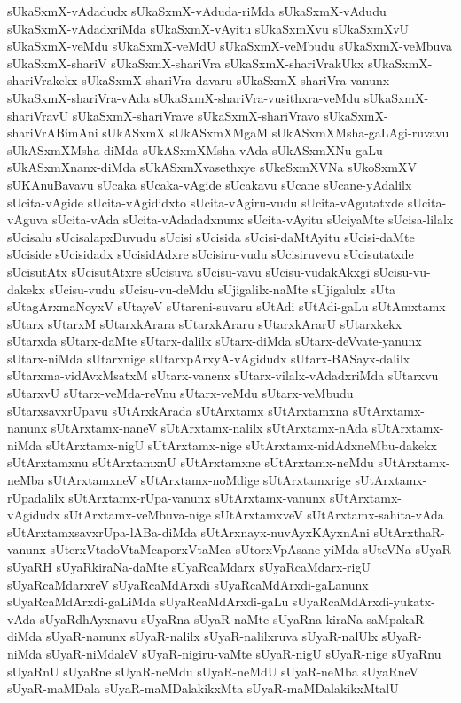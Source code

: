 {sUkaSxmX-vAdadudx
sUkaSxmX-vAduda-riMda
sUkaSxmX-vAdudu
sUkaSxmX-vAdadxriMda
sUkaSxmX-vAyitu
sUkaSxmXvu
sUkaSxmXvU
sUkaSxmX-veMdu
sUkaSxmX-veMdU
sUkaSxmX-veMbudu
sUkaSxmX-veMbuva
sUkaSxmX-shariV
sUkaSxmX-shariVra
sUkaSxmX-shariVrakUkx
sUkaSxmX-shariVrakekx
sUkaSxmX-shariVra-davaru
sUkaSxmX-shariVra-vanunx
sUkaSxmX-shariVra-vAda
sUkaSxmX-shariVra-vusithxra-veMdu
sUkaSxmX-shariVravU
sUkaSxmX-shariVrave
sUkaSxmX-shariVravo
sUkaSxmX-shariVrABimAni
sUkASxmX
sUkASxmXMgaM
sUkASxmXMsha-gaLAgi-ruvavu
sUkASxmXMsha-diMda
sUkASxmXMsha-vAda
sUkASxmXNu-gaLu
sUkASxmXnanx-diMda
sUkASxmXvasethxye
sUkeSxmXVNa
sUkoSxmXV
sUKAnuBavavu
sUcaka
sUcaka-vAgide
sUcakavu
sUcane
sUcane-yAdalilx
sUcita-vAgide
sUcita-vAgididxto
sUcita-vAgiru-vudu
sUcita-vAgutatxde
sUcita-vAguva
sUcita-vAda
sUcita-vAdadadxnunx
sUcita-vAyitu
sUciyaMte
sUcisa-lilalx
sUcisalu
sUcisalapxDuvudu
sUcisi
sUcisida
sUcisi-daMtAyitu
sUcisi-daMte
sUciside
sUcisidadx
sUcisidAdxre
sUcisiru-vudu
sUcisiruvevu
sUcisutatxde
sUcisutAtx
sUcisutAtxre
sUcisuva
sUcisu-vavu
sUcisu-vudakAkxgi
sUcisu-vu-dakekx
sUcisu-vudu
sUcisu-vu-deMdu
sUjigalilx-naMte
sUjigalulx
sUta
sUtagArxmaNoyxV
sUtayeV
sUtareni-suvaru
sUtAdi
sUtAdi-gaLu
sUtAmxtamx
sUtarx
sUtarxM
sUtarxkArara
sUtarxkAraru
sUtarxkArarU
sUtarxkekx
sUtarxda
sUtarx-daMte
sUtarx-dalilx
sUtarx-diMda
sUtarx-deVvate-yanunx
sUtarx-niMda
sUtarxnige
sUtarxpArxyA-vAgidudx
sUtarx-BASayx-dalilx
sUtarxma-vidAvxMsatxM
sUtarx-vanenx
sUtarx-vilalx-vAdadxriMda
sUtarxvu
sUtarxvU
sUtarx-veMda-reVnu
sUtarx-veMdu
sUtarx-veMbudu
sUtarxsavxrUpavu
sUtArxkArada
sUtArxtamx
sUtArxtamxna
sUtArxtamx-nanunx
sUtArxtamx-naneV
sUtArxtamx-nalilx
sUtArxtamx-nAda
sUtArxtamx-niMda
sUtArxtamx-nigU
sUtArxtamx-nige
sUtArxtamx-nidAdxneMbu-dakekx
sUtArxtamxnu
sUtArxtamxnU
sUtArxtamxne
sUtArxtamx-neMdu
sUtArxtamx-neMba
sUtArxtamxneV
sUtArxtamx-noMdige
sUtArxtamxrige
sUtArxtamx-rUpadalilx
sUtArxtamx-rUpa-vanunx
sUtArxtamx-vanunx
sUtArxtamx-vAgidudx
sUtArxtamx-veMbuva-nige
sUtArxtamxveV
sUtArxtamx-sahita-vAda
sUtArxtamxsavxrUpa-lABa-diMda
sUtArxnayx-nuvAyxKAyxnAni
sUtArxthaR-vanunx
sUterxVtadoVtaMcaporxVtaMca
sUtorxVpAsane-yiMda
sUteVNa
sUyaR
sUyaRH
sUyaRkiraNa-daMte
sUyaRcaMdarx
sUyaRcaMdarx-rigU
sUyaRcaMdarxreV
sUyaRcaMdArxdi
sUyaRcaMdArxdi-gaLanunx
sUyaRcaMdArxdi-gaLiMda
sUyaRcaMdArxdi-gaLu
sUyaRcaMdArxdi-yukatx-vAda
sUyaRdhAyxnavu
sUyaRna
sUyaR-naMte
sUyaRna-kiraNa-saMpakaR-diMda
sUyaR-nanunx
sUyaR-nalilx
sUyaR-nalilxruva
sUyaR-nalUlx
sUyaR-niMda
sUyaR-niMdaleV
sUyaR-nigiru-vaMte
sUyaR-nigU
sUyaR-nige
sUyaRnu
sUyaRnU
sUyaRne
sUyaR-neMdu
sUyaR-neMdU
sUyaR-neMba
sUyaRneV
sUyaR-maMDala
sUyaR-maMDalakikxMta
sUyaR-maMDalakikxMtalU
}
